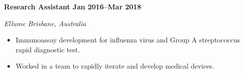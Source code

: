 \textbf{Research Assistant \hfill Jan 2016--Mar 2018}\par
\textit{Ellume \hfill Brisbane, Australia}\par
\begin{itemize}
	\item Immunoassay development for influenza virus and Group A streptococcus rapid diagnostic test.
	\item Worked in a team to rapidly iterate and develop medical devices.
\end{itemize}\par